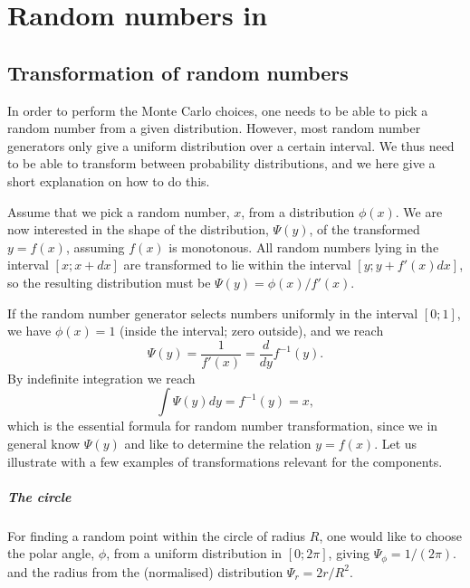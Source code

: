 \chapter{Random numbers in \MCS}
\label{s:random}

\section{Transformation of random numbers}

In order to perform the Monte Carlo choices, one needs to be able to pick a
random number from a given distribution. However, most random number generators
only give a uniform distribution over a certain interval.  We thus need to be
able to transform between probability distributions, and we here give a short
explanation on how to do this.

Assume that we pick a random number, $x$, from a distribution $\phi(x)$.
We are now interested in the shape of the distribution, $\Psi(y)$, of the
transformed $y=f(x)$, assuming $f(x)$ is monotonous.
All random numbers lying in the interval $[x; x+dx]$
are transformed to lie within the interval $[y; y+f'(x)dx]$, so the
resulting distribution must be $\Psi(y) = \phi(x) / f'(x)$.

If the random number generator selects numbers uniformly in the interval
$[0; 1]$, we have $\phi(x) = 1$ (inside the interval; zero outside), and
we reach
\begin{equation}
\Psi(y) = \frac{1}{f'(x)} = \frac{d}{dy} f^{-1}(y) .
\end{equation}
By indefinite integration we reach
\begin{equation}
\label{e:randtrans}
\int \Psi(y) dy = f^{-1}(y) = x ,
\end{equation}
which is the essential formula for random number transformation, since we
in general know $\Psi(y)$ and like to determine the relation $y=f(x)$.
Let us illustrate with a few examples of transformations relevant for the
\MCS components.

\paragraph{The circle}
For finding a random point within the
circle of radius $R$, one would like to choose the polar angle, $\phi$,
from a uniform
distribution in $[0; 2\pi]$, giving $\Psi_\phi = 1/(2\pi)$.
and the radius from the (normalised) distribution $\Psi_r=2r/R^2$.

